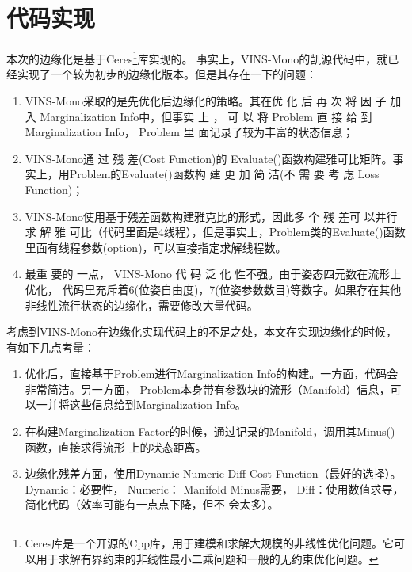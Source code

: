 \documentclass[12pt, onecolumn]{article}
\newcommand\normf{\fangsong}
\begin{document}
		\section{\normf 代码实现}
		本次的边缘化是基于Ceres\footnote{\normf Ceres库是一个开源的Cpp库，用于建模和求解大规模的非线性优化问题。它可以用于求解有界约束的非线性最小二乘问题和一般的无约束优化问题。}库\cite{Agarwal_Ceres_Solver_2022}实现的。
		事实上，VINS-Mono\cite{qin2018vins}的凯源代码中，就已经实现了一个较为初步的边缘化版本。但是其存在一下的问题：
		\begin{enumerate}
		\item VINS-Mono采取的是先优化后边缘化的策略。其在优 化 后 再 次 将 因 子 加 入
		Marginalization Info中，但事实
		上 ， 可 以 将 Problem 直 接 给 到
		Marginalization Info， Problem 里 面记录了较为丰富的状态信息；
		
		\item VINS-Mono通 过 残 差(Cost Function)的
		Evaluate()函数构建雅可比矩阵。事
		实上，用Problem的Evaluate()函数构
		建 更 加 简 洁(不 需 要 考 虑 Loss
		Function)；
		
		\item VINS-Mono使用基于残差函数构建雅克比的形式，因此多 个 残 差可 以并行 求 解 雅
		可比（代码里面是4线程），但是事实上，Problem类的Evaluate()函数
		里面有线程参数(option)，可以直接指定求解线程数。
		
		\item 最重 要的 一点， VINS-Mono 代 码 泛 化
		性不强。由于姿态四元数在流形上优化，
		代码里充斥着6(位姿自由度)，7(位姿参数数目)等数字。如果存在其他非线性流行状态的边缘化，需要修改大量代码。
		\end{enumerate}
		
		考虑到VINS-Mono在边缘化实现代码上的不足之处，本文在实现边缘化的时候，有如下几点考量：
		\begin{enumerate}
		\item 优化后，直接基于Problem进行Marginalization Info的构建。一方面，代码会非常简洁。另一方面，
		Problem本身带有参数块的流形（Manifold）信息，可以一并将这些信息给到Marginalization Info。
		
		\item 在构建Marginalization Factor的时候，通过记录的Manifold，调用其Minus()函数，直接求得流形
		上的状态距离。
		
		\item 边缘化残差方面，使用Dynamic Numeric Diff Cost Function（最好的选择）。 Dynamic：必要性，
		Numeric： Manifold Minus需要， Diff：使用数值求导，简化代码（效率可能有一点点下降，但不
		会太多）。
		\end{enumerate}
		
\end{document}
